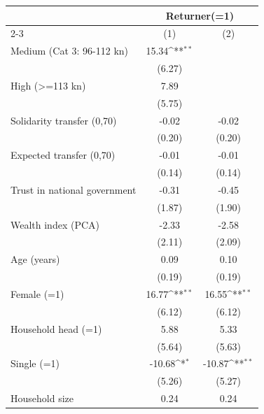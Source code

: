 {
\def\sym#1{\ifmmode^{#1}\else\(^{#1}\)\fi}
\begin{tabular}{l*{2}{c}}
\toprule
                    &\multicolumn{2}{c}{Returner(=1)}           \\\cmidrule(lr){2-3}
                    &\multicolumn{1}{c}{(1)}         &\multicolumn{1}{c}{(2)}         \\
\midrule
Medium (Cat 3: 96-112 kn)&       15.34\sym{**} &                     \\
                    &      (6.27)         &                     \\
High (>=113 kn)     &        7.89         &                     \\
                    &      (5.75)         &                     \\
Solidarity transfer (0,70)&       -0.02         &       -0.02         \\
                    &      (0.20)         &      (0.20)         \\
Expected transfer (0,70)&       -0.01         &       -0.01         \\
                    &      (0.14)         &      (0.14)         \\
Trust in national government&       -0.31         &       -0.45         \\
                    &      (1.87)         &      (1.90)         \\
Wealth index (PCA)  &       -2.33         &       -2.58         \\
                    &      (2.11)         &      (2.09)         \\
Age (years)         &        0.09         &        0.10         \\
                    &      (0.19)         &      (0.19)         \\
Female (=1)         &       16.77\sym{**} &       16.55\sym{**} \\
                    &      (6.12)         &      (6.12)         \\
Household head (=1) &        5.88         &        5.33         \\
                    &      (5.64)         &      (5.63)         \\
Single (=1)         &      -10.68\sym{*}  &      -10.87\sym{**} \\
                    &      (5.26)         &      (5.27)         \\
Household size      &        0.24         &        0.24         \\

\end{tabular}}
